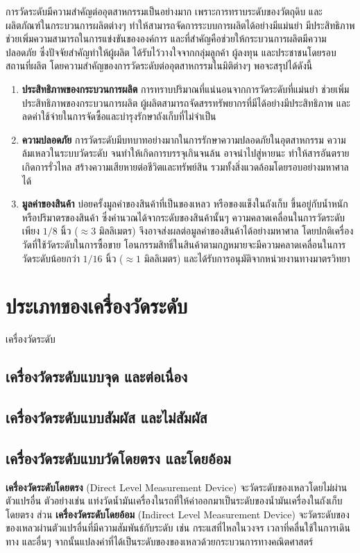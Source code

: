 \documentclass[final,11pt]{article}
\begin{document}
การวัดระดับมีความสำคัญต่ออุตสาหกรรมเป็นอย่างมาก เพราะการทราบระดับของวัตถุดิบ และผลิตภัณฑ์ในกระบวนการผลิตต่างๆ
ทำให้สามารถจัดการระบบการผลิตได้อย่างมีแม่นยำ มีประสิทธิภาพ ช่วยเพิ่มความสามารถในการแข่งขันขององค์การ 
และที่สำคัญคือช่วยให้กระบวนการผลิตมีความปลอดภัย ซึ่งปัจจัยสำคัญทำให้ผู้ผลิต ได้รับไว้วางใจจากกลุ่มลูกค้า ผู้ลงทุน และประชาชนโดยรอบสถานที่ผลิต
โดยความสำคัญของการวัดระดับต่ออุตสาหกรรมในมิติต่างๆ พอจะสรุปได้ดังนี้ 
\begin{enumerate}
    \item \textbf{ประสิทธิภาพของกระบวนการผลิต} การทราบปริมาณที่แน่นอนจากการวัดระดับที่แม่นยำ
    ช่วยเพิ่มประสิทธิภาพของกระบวนการผลิต ผู้ผลิตสามารถจัดสรรทรัพยากรที่มีได้อย่างมีประสิทธิภาพ 
    และลดค่าใช้จ่ายในการจัดซื้อและบำรุงรักษาถังเก็บที่ไม่จำเป็น
    \item \textbf{ความปลอดภัย} การวัดระดับมีบทบาทอย่างมากในการรักษาความปลอดภัยในอุตสาหกรรม
    ความล้มเหลวในระบบวัดระดับ จนทำให้เกิดการบรรจุเกินจนล้น อาจนำไปสู่หายนะ ทำให้สารอันตรายเกิดการรั่วไหล
    สร้างความเสียหายต่อชีวิตและทรัพย์สิน รวมทั้งสิ่งแวดล้อมโดยรอบอย่างมหาศาลได้ 
    \item \textbf{มูลค่าของสินค้า} บ่อยครั้งมูลค่าของสินค้าที่เป็นของเหลว หรือของแข็งในถังเก็บ
    ขึ้นอยู่กับน้ำหนัก หรือปริมาตรของสินค้า ซึ่งคำนวณได้จากระดับของสินค้านั้นๆ 
    ความคลาดเคลื่อนในการวัดระดับเพียง $1/8$ นิ้ว ($\approx 3$ มิลลิเมตร) 
    จึงอาจส่งผลต่อมูลค่าของสินค้าได้อย่างมหาศาล โดยปกติเครื่องวัดที่ใช้วัดระดับในการซื้อขาย
    โอนกรรมสิทธิ์ในสินค้าตามกฏหมายจะมีความคลาดเคลื่อนในการวัดระดับน้อยกว่า  $1/16$ นิ้ว ($\approx 1$ มิลลิเมตร)
    และได้รับการอนุมัติจากหน่วยงานทางมาตรวิทยา
\end{enumerate}
\section{ประเภทของเครื่องวัดระดับ}
เครื่องวัดระดับ
\subsection{เครื่องวัดระดับแบบจุด และต่อเนื่อง}


\subsection{เครื่องวัดระดับแบบสัมผัส และไม่สัมผัส}

\subsection{เครื่องวัดระดับแบบวัดโดยตรง และโดยอ้อม}
\textbf{เครื่องวัดระดับโดยตรง} (Direct Level Measurement Device) จะวัดระดับของเหลวโดยไม่ผ่านตัวแปรอื่น ตัวอย่างเช่น
 แท่งวัดน้ำมันเครื่องในรถที่ให้ค่าออกมาเป็นระดับของน้ำมันเครื่องในถังเก็บโดยตรง 
 ส่วน \textbf{เครื่องวัดระดับโดยอ้อม} (Indirect Level Measurement Device) จะวัดระดับของของเหลวผ่านตัวแปรอื่นที่มีความสัมพันธ์กับระดับ เช่น กระแสที่ไหลในวงจร 
 เวลาที่คลื่นใช้ในการเดินทาง และอื่นๆ จากนั้นแปลงค่าที่ได้เป็นระดับของของเหลวด้วยกระบวนการทางคณิตศาสตร์
\end{document}
